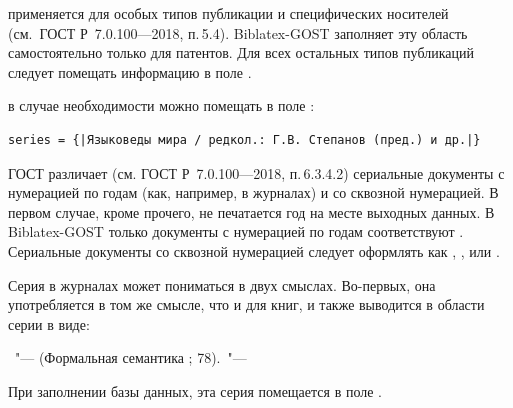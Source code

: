 \documentclass[10pt,a4paper,headings=small,numbers=enddot,english,russian]{ltxdockit}
\newcommand*{\biblatexgost}{Biblatex-GOST\xspace}
\newcommand*{\gostbibname}[1][]{ГОСТ#1 Р~7.0.100---2018\xspace}
\newcommand*{\gostbibref}[2][]{\gostbibname[#1], п.\,#2\xspace}
\newcommand*{\notimpl}{\footnote{Не реализовано в данной версии \biblatexgost.}}
\newenvironment{bibexample}{\begin{list}
     {}
     {\setlength{\leftmargin}{\parindent}%
      \setlength{\itemindent}{-\leftmargin}%
      \setlength{\parsep}{0pt}}}
  {\end{list}}
\begin{document}
\begin{description}
%
%
\item[Область специфических сведений] применяется для
особых типов публикации и специфических носителей (см.~\gostbibref{5.4}).
\biblatexgost заполняет эту область самостоятельно только для
патентов.
Для всех остальных типов публикаций
следует помещать информацию в поле .


\item[Cведения об ответственности серии] в случае необходимости можно помещать
в поле :
\begin{lstlisting}[style=bibtex,escapechar=|]
series = {|Языковеды мира / редкол.: Г.В. Степанов (пред.) и др.|}
\end{lstlisting}

\item[Серия.] \label{series}ГОСТ различает (см. \gostbibref{6.3.4.2}) сериальные документы
с нумерацией по годам
(как, например, в журналах) и со сквозной нумерацией. В первом случае, кроме прочего,
не печатается год на месте выходных данных. В \biblatexgost только документы
с нумерацией по годам соответствуют .  Сериальные документы со
сквозной нумерацией следует оформлять как , ,
 или .

Серия в журналах может пониматься в двух смыслах. Во-первых, она употребляется в
том же смысле, что и для книг, и также выводится в области серии в виде:

\begin{bibexample}
\item \textellipsis~"--- (Формальная семантика ; 78).~"--- \textellipsis
\end{bibexample}

При заполнении базы данных, эта серия помещается в поле .


\end{description}
\end{document}
